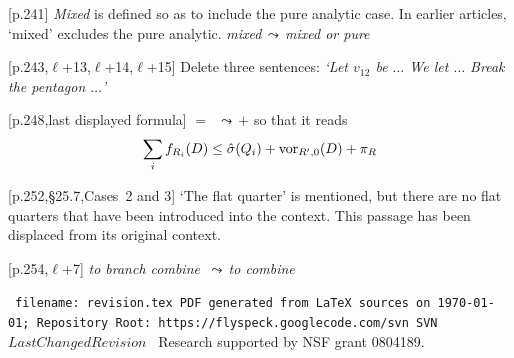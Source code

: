 \documentclass[11pt]{amsart}
\def\svninfo{{\tt
  filename: revision.tex\hfill\break
  PDF generated from LaTeX sources on \today; \hfill\break
  Repository Root: https://flyspeck.googlecode.com/svn \hfill\break
  SVN $LastChangedRevision$
  }
  }
\def\op#1{{\text{#1}}}
\def\lto{\ensuremath{\,\leadsto\,}}
\def\line{$\ell$}
\def\text{\hbox}
\def\sz{small} %
\def\rmx{\rm}
\def\calc#1{{\textsc{calc-#1}}}
\begin{document}
\begin{\sz}

%




[p.241]  {\rmx {\it Mixed} is defined so as to include
the pure analytic case.  In earlier articles,
`mixed' excludes the pure analytic.  }
	{\it mixed\lto mixed or pure}
	
[p.243,\line+13,\line+14,\line+15]
	{\rmx Delete three sentences:}
	{\it `Let $v_{12}$ be $\ldots$  We let $\ldots$
	 Break the pentagon $\ldots$'}
	
[p.248,last displayed formula]  
	$=$ \lto $+$
{\rmx so that it reads}
	$$
	\sum_i f_{R_i}(D) \le \hat\sigma(Q_i) +
	\op{vor}_{R',0}(D) + \pi_R
	$$

[p.252,\S25.7,Cases~2 and 3]  {\rmx `The flat quarter'
is mentioned, but there are no flat quarters
that have been introduced into the context.  
This passage
has been displaced from its original context.}

[p.254,\line+7]
{\it to branch combine \lto to combine}
\end{\sz}






\bigskip

\begin{\sz}
\svninfo\hfill\break
{Research supported by NSF grant 0804189.}
\end{\sz}
\end{document}
